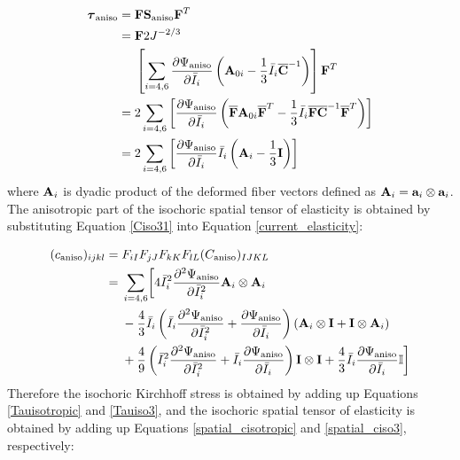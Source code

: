 \begin{appendices}
\begin{equation} \label{Tauiso3}
\begin{split}
\boldsymbol{\tau}_\mathrm{aniso}
={}& \bold{F}\bold{S}_\mathrm{aniso}{\bold{F}}^T \\
={}& \bold{F} 2J^{-2/3} \\ &\left[\sum_{i = 4, 6}\frac{\partial{\Psi_\mathrm{aniso}}}{\partial{\bar{I}_i}}  \left(\bold{A}_{0i} - \frac{1}{3}\bar{I}_i\overline{\bold{C}}^{-1} \right)\right] {\bold{F}}^T \\
={}& 2\sum_{i = 4, 6}\left[\frac{\partial{\Psi_\mathrm{aniso}}}{\partial{\bar{I}_i}} \left({\overline{\bold{F}}}\bold{A}_{0i}{\overline{\bold{F}}}^T - \frac{1}{3}\bar{I}_i{\overline{\bold{F}}}\overline{\bold{C}}^{-1}{\overline{\bold{F}}}^T \right)\right] \\
={}& 2\sum_{i = 4, 6}\left[\frac{\partial{\Psi_\mathrm{aniso}}}{\partial{\bar{I}_i}}\bar{I}_i \left(\bold{A}_{i} - \frac{1}{3}\bold{I} \right)\right]
\end{split}
\end{equation}
where $\bold{A}_i$ is dyadic product of the deformed fiber vectors defined as $\bold{A}_i = \bold{a}_i \otimes \bold{a}_i$. 
The anisotropic part of the isochoric spatial tensor of elasticity is obtained by substituting Equation \ref{Ciso31} into Equation \ref{current_elasticity}:

\begin{equation} \label{spatial_ciso3}
\begin{split}
(c_\mathrm{aniso})_{ijkl} ={}&  F_{iI}F_{jJ}F_{kK}F_{lL}(C_\mathrm{aniso})_{IJKL} \\
={}& 
 \sum_{i = 4, 6} \biggl[4{\bar{I}_i}^2\frac{\partial^2\Psi_\mathrm{aniso}}{\partial{\bar{I}_i}^2} \bold{A}_{i} \otimes \bold{A}_{i} \\ &- \frac{4}{3}\bar{I}_i\left(\bar{I}_i\frac{\partial^2\Psi_\mathrm{aniso}}{\partial{\bar{I}_i}^2} + \frac{\partial\Psi_\mathrm{aniso}}{\partial{\bar{I}_i}}\right)
 (\bold{A}_{i} \otimes \bold{I} + \bold{I} \otimes \bold{A}_i) \\
&+ \frac{4}{9}\left({\bar{I}_i}^2\frac{\partial^2\Psi_\mathrm{aniso}}{\partial{\bar{I}_i}^2} + \bar{I}_i\frac{\partial\Psi_\mathrm{aniso}}{\partial{\bar{I}_i}}\right)\bold{I} \otimes \bold{I} 
+ \frac{4}{3}\bar{I}_i \frac{\partial\Psi_\mathrm{aniso}}{\partial{\bar{I}_i}} \mathbb{I} \biggr]
\end{split}
\end{equation}
Therefore the isochoric Kirchhoff stress is obtained by adding up Equations \ref{Tauisotropic} and \ref{Tauiso3}, and the isochoric spatial tensor of elasticity is obtained by adding up Equations \ref{spatial_cisotropic} and \ref{spatial_ciso3}, respectively:


\end{appendices}
